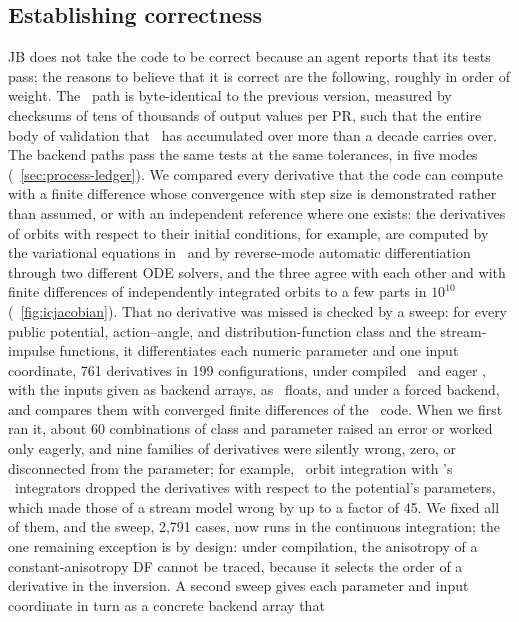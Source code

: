 \subsection{Establishing correctness}\label{sec:process-correctness}

JB does not take the code to be correct because an agent reports that
its tests pass; the reasons to believe that it is correct are the
following, roughly in order of weight. The \numpy\ path is byte-identical to the previous
version, measured by checksums of tens of thousands of output values per
PR, such that the entire body of validation that \galpy\ has accumulated
over more than a decade carries over. The backend paths pass the same
tests at the same tolerances, in five modes
(\sectionname~\ref{sec:process-ledger}). We compared every derivative
that the code can compute with a finite difference whose convergence
with step size is demonstrated rather than assumed, or with an
independent reference where one exists: the derivatives of orbits with
respect to their initial conditions, for example, are computed by the
variational equations in \cc\ and by reverse-mode automatic
differentiation through two different ODE solvers, and the three agree
with each other and with finite differences of independently integrated
orbits to a few parts in $10^{10}$ (\figurename~\ref{fig:icjacobian}).
That no derivative was missed is checked by a sweep: for every public
potential, action--angle, and distribution-function class and the
stream-impulse functions, it differentiates each numeric parameter and
one input coordinate, 761 derivatives in 199 configurations, under
compiled \jax\ and eager \torch, with the inputs given as backend
arrays, as \python\ floats, and under a forced backend, and compares
them with converged finite differences of the \numpy\ code. When we
first ran it, about 60 combinations of class and parameter raised an
error or worked only eagerly, and nine families of derivatives were
silently wrong, zero, or disconnected from the parameter; for example,
\torch\ orbit integration with \galpy's \cc\ integrators dropped the
derivatives with respect to the potential's parameters, which made those
of a stream model wrong by up to a factor of 45. We fixed all of them,
and the sweep, 2,791 cases, now runs in the continuous integration; the
one remaining exception is by design: under compilation, the anisotropy
of a constant-anisotropy DF cannot be traced, because it selects the
order of a derivative in the inversion. A second sweep gives each
parameter and input coordinate in turn as a concrete backend array that

